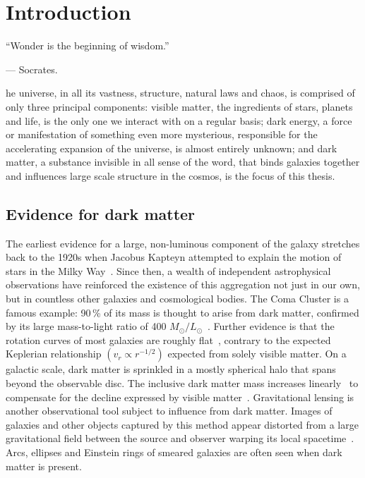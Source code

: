 %
%
\chapter{Introduction}  %
\label{chap:intro}


\epigraph{\hfill``Wonder is the beginning of wisdom.''}{--- Socrates.}  %

he universe, in all its vastness, structure, natural laws and chaos, is comprised of only three principal components: visible matter, the ingredients of stars, planets and life, is the only one we interact with on a regular basis; dark energy, a force or manifestation of something even more mysterious, responsible for the accelerating expansion of the universe, is almost entirely unknown; and dark matter, a substance invisible in all sense of the word, that binds galaxies together and influences large scale structure in the cosmos, is the focus of this thesis.




\section{Evidence for dark matter}
\label{sec:intro_dm_evidence}

The earliest evidence for a large, non-luminous component of the galaxy stretches back to the 1920s when Jacobus Kapteyn attempted to explain the motion of stars in the Milky Way~\cite{1922ApJ....55..302K}. Since then, a wealth of independent astrophysical observations have reinforced the existence of this aggregation not just in our own, but in countless other galaxies and cosmological bodies. The Coma Cluster is a famous example: 90\,\% of its mass is thought to arise from dark matter, confirmed by its large mass-to-light ratio of 400 $M_{\odot} / L_{\odot}$~\cite{Yozin:2015mla}. Further evidence is that the rotation curves of most galaxies are roughly flat~\cite{1996MNRAS-281-27P}, contrary to the expected Keplerian relationship $(v_r \propto r^{-1/2})$ expected from solely visible matter. On a galactic scale, dark matter is sprinkled in a mostly spherical halo that spans beyond the observable disc. The inclusive dark matter mass increases linearly~\cite{2009arXiv0901.0632E} to compensate for the decline expressed by visible matter~\cite{1970ApJ-160-811F,1992AandA-256-19B}. Gravitational lensing is another observational tool subject to influence from dark matter. Images of galaxies and other objects captured by this method appear distorted from a large gravitational field between the source and observer warping its local spacetime~\cite{2010GReGr..42.2177H}. Arcs, ellipses and Einstein rings of smeared galaxies are often seen when dark matter is present.

